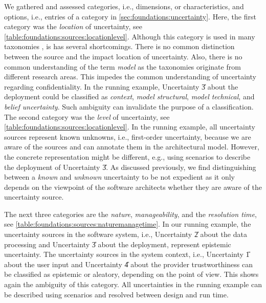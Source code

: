 We gathered and assessed categories, i.e., dimensions, or characteristics, and options, i.e., entries of a category in \autoref{sec:foundations:uncertainty}.
Here, the first category was the \emph{location} of uncertainty, see \autoref{table:foundations:sources:locationlevel}.
Although this category is used in many taxonomies \cite{bures_capturing_2020,mahdavi-hezavehi_classification_2017,perez-palacin_uncertainties_2014,walker_defining_2003,troya_uncertainty_2021,PSUM}, is has several shortcomings. 
There is no common distinction between the source and the impact location of uncertainty.
Also, there is no common understanding of the term \emph{model} as the taxonomies originate from different research areas.
This impedes the common understanding of uncertainty regarding confidentiality.
In the running example, Uncertainty \U{3} about the deployment could be classified as \emph{context}, \emph{model structural}, \emph{model technical}, and \emph{belief uncertainty}.
Such ambiguity can invalidate the purpose of a classification.
The second category was the \emph{level} of uncertainty, see \autoref{table:foundations:sources:locationlevel}. 
In the running example, all uncertainty sources represent known unknowns, i.e., first-order uncertainty, because we are aware of the sources and can annotate them in the architectural model.
However, the concrete representation might be different, e.g., using scenarios to describe the deployment of Uncertainty \U{3}.
As discussed previously, we find distinguishing between a \emph{known} and \emph{unknown} uncertainty to be not expedient as it only depends on the viewpoint of the software architects whether they are aware of the uncertainty source.

The next three categories are the \emph{nature}, \emph{manageability}, and the \emph{resolution time}, see \autoref{table:foundations:sources:naturemanagetime}.
In our running example, the uncertainty sources in the software system, i.e., Uncertainty \U{2} about the data processing and Uncertainty \U{3} about the deployment, represent epistemic uncertainty.
The uncertainty sources in the system context, i.e., Uncertainty \U{1} about the user input and Uncertainty \U{4} about the provider trustworthiness can be classified as epistemic or aleatory, depending on the point of view.
This shows again the ambiguity of this category.
All uncertainties in the running example can be described using scenarios and resolved between design and run time.

